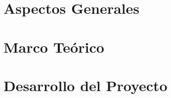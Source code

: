 \documentclass[12pt]{report}
\begin{document}
\begin{spacing}{1.05} %





\renewcommand{\contentsname}{Índice General}
\renewcommand{\listfigurename}{Índice de Figuras}
\renewcommand{\listtablename}{Índice de Tablas}
\renewcommand\tablename{Tabla}
\tableofcontents

\cleardoublepage
{} %
\listoffigures

\cleardoublepage
{} %
\listoftables




\clearpage
{}
\setcounter{page}{1}



\part{Aspectos Generales}
 

\part{Marco Teórico}


\part{Desarrollo del Proyecto}




\renewcommand\bibname{Resultados}

\renewcommand\bibname{Conclusiones}

\renewcommand\bibname{Recomendaciones}

\renewcommand\bibname{TrabajosFuturos}

\end{spacing}



{}
\begin{spacing}{1.0}
\nocite{*}

\end{spacing}
\end{document}
